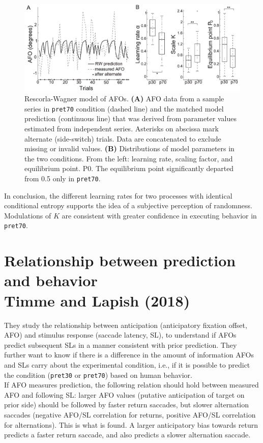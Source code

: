 \begin{figure}[!ht]
    \centering
    \captionsetup{width=.8\linewidth}
    \includegraphics[width=0.75\linewidth]{images/rescorla.png}
    \caption*{Rescorla-Wagner model of AFOs. \textbf{(A)} AFO data from a sample series in \texttt{pret70} condition (dashed line) and the matched model prediction (continuous line) that was derived from parameter values estimated from independent series. Asterisks on abscissa mark alternate (side-switch) trials. Data are concatenated to exclude missing or invalid values. \textbf{(B)} Distributions of model parameters in the two conditions. From the left: learning rate, scaling factor, and equilibrium point. P0. The equilibrium point significantly departed from 0.5 only in \texttt{pret70}.}
    \label{fig:rescorla}
\end{figure}

In conclusion, the different learning rates for two processes with identical conditional entropy supports the idea of a subjective perception of randomness. Modulations of $K$ are consistent with greater confidence in executing behavior in \texttt{pret70}.

\section[Relationship between prediction and behavior]{Relationship between prediction and behavior\\ Timme and Lapish (2018)
}
They study the relationship between anticipation (anticipatory fixation offset, AFO) and stimulus response (saccade latency, SL), to understand if AFOs predict subsequent SLs in a manner consistent with prior prediction. They further want to know if there is a difference in the amount of information AFOs and SLs carry about the experimental condition, i.e., if it is possible to predict the condition (\texttt{pret30} or \texttt{pret70}) based on human behavior.\\

If AFO measures prediction, the following relation should hold between measured AFO and following SL: larger AFO values (putative anticipation of target on prior side) should be followed by faster return saccades, but slower alternation saccades (negative AFO/SL correlation for returns, positive AFO/SL correlation for alternations). This is what is found. A larger anticipatory bias towards return predicts a faster return saccade, and also predicts a slower alternation saccade.\\

